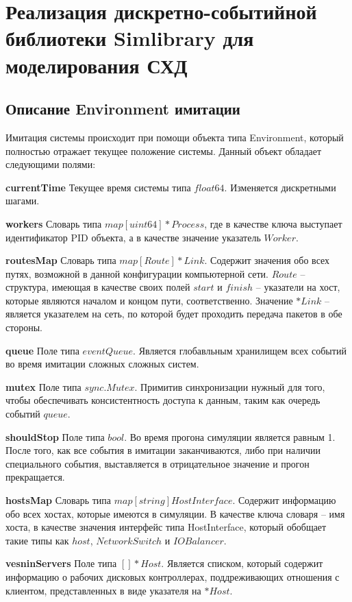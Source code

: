 \section{Реализация дискретно-событийной библиотеки Simlibrary для моделирования СХД}

\subsection{Описание Environment имитации}

Имитация системы происходит при помощи объекта типа Environment, который полностью отражает текущее положение системы. Данный объект обладает следующими полями:

\textbf{currentTime}
Текущее время системы типа $float64$. Изменяется дискретными шагами.

\textbf{workers}
Словарь типа $map[uint64]*Process$, где в качестве ключа выступает идентификатор PID объекта, а в качестве значение указатель $Worker$.

\textbf{routesMap}  
Словарь типа  $map[Route]*Link$. Содержит значения обо всех путях, возможной в данной конфигурации компьютерной сети. $Route$ -- структура, имеющая в качестве своих полей $start$ и $finish$ -- указатели на хост, которые являются началом и концом пути, соответственно. Значение $*Link$ -- является указателем на сеть, по которой будет проходить передача пакетов в обе стороны.


\textbf{queue}
Поле типа $eventQueue$. Является глобавльным хранилищем всех событий во время имитации сложных сложных систем.

\textbf{mutex}         
Поле типа $sync.Mutex$. Примитив синхронизации нужный для того, чтобы обеспечивать консистентность доступа к данным, таким как очередь событий $queue$. 

\textbf{shouldStop}    
Поле типа $bool$. Во время прогона симуляции является равным 1. После того, как все события в имитации заканчиваются, либо при наличии специального события, выставляется в отрицательное значение и прогон прекращается.

\textbf{hostsMap}      
Словарь типа $map[string]HostInterface$. Содержит информацию обо всех хостах, которые имеются в симуляции. В качестве ключа словаря -- имя хоста, в качестве значения интерфейс типа HostInterface, который обобщает такие типы как $host$, $NetworkSwitch$ и $IOBalancer$.

\textbf{vesninServers}
Поле типа $[]*Host$. Является списком, который содержит информацию о рабочих дисковых контроллерах, поддреживающих отношения с клиентом, представленных в виде указателя на $*Host$.

